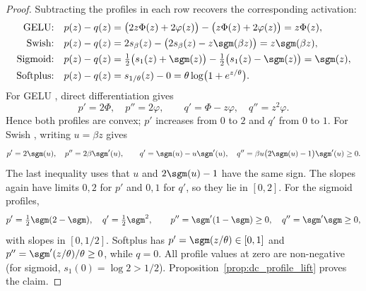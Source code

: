 \begin{proof}
Subtracting the profiles in each row recovers the corresponding activation:
\begin{align*}
\text{GELU:}\quad p(z)-q(z)
    &=\bigl(2z\Phi(z)+2\varphi(z)\bigr)-\bigl(z\Phi(z)+2\varphi(z)\bigr)=z\Phi(z),\\
\text{Swish:}\quad p(z)-q(z)
    &=2s_\beta(z)-\bigl(2s_\beta(z)-z\sgm(\beta z)\bigr)=z\sgm(\beta z),\\
\text{Sigmoid:}\quad p(z)-q(z)
    &=\tfrac12\bigl(s_1(z)+\sgm(z)\bigr)-\tfrac12\bigl(s_1(z)-\sgm(z)\bigr)=\sgm(z),\\
\text{Softplus:}\quad p(z)-q(z)
    &=s_{1/\theta}(z)-0=\theta\log\bigl(1+e^{z/\theta}\bigr).
\end{align*}
For GELU \parencite{Hendrycks2016}, direct differentiation gives
\begin{equation*}
    p'=2\Phi,\quad p''=2\varphi,\qquad
    q'=\Phi-z\varphi,\quad q''=z^2\varphi.
\end{equation*}
Hence both profiles are convex; $p'$ increases from $0$ to $2$ and $q'$ from $0$ to $1$. For Swish \parencite{Ramachandran2017_swish}, writing $u=\beta z$ gives
\begin{equation*}
    p'=2\sgm(u),\quad p''=2\beta\sgm'(u),\qquad
    q'=\sgm(u)-u\sgm'(u),\quad
    q''=\beta u\bigl(2\sgm(u)-1\bigr)\sgm'(u)\ge0.
\end{equation*}
The last inequality uses that $u$ and $2\sgm(u)-1$ have the same sign. The slopes again have limits $0,2$ for $p'$ and $0,1$ for $q'$, so they lie in $[0,2]$. For the sigmoid profiles,
\begin{equation*}
    p'=\tfrac12\sgm(2-\sgm),\quad
    q'=\tfrac12\sgm^2,\qquad
    p''=\sgm'(1-\sgm)\ge0,\quad q''=\sgm'\sgm\ge0,
\end{equation*}
with slopes in $[0,1/2]$. Softplus has $p'=\sgm(z/\theta)\in[0,1]$ and $p''=\sgm'(z/\theta)/\theta\ge0$, while $q=0$. All profile values at zero are non-negative (for sigmoid, $s_1(0)=\log2>1/2$). Proposition~\ref{prop:dc_profile_lift} proves the claim.
\end{proof}

